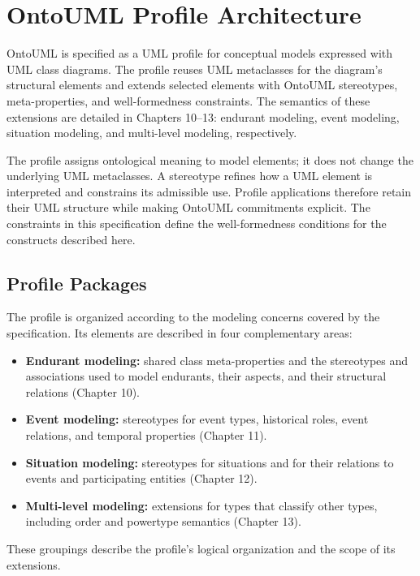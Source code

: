 \chapter{OntoUML Profile Architecture}
\label{ch:profile-architecture}

OntoUML is specified as a UML profile for conceptual models expressed with UML class diagrams. The profile reuses UML metaclasses for the diagram's structural elements and extends selected elements with OntoUML stereotypes, meta-properties, and well-formedness constraints. The semantics of these extensions are detailed in Chapters 10--13: endurant modeling, event modeling, situation modeling, and multi-level modeling, respectively.

The profile assigns ontological meaning to model elements; it does not change the underlying UML metaclasses. A stereotype refines how a UML element is interpreted and constrains its admissible use. Profile applications therefore retain their UML structure while making OntoUML commitments explicit. The constraints in this specification define the well-formedness conditions for the constructs described here.

\section{Profile Packages}
\label{sec:profile-packages}

The profile is organized according to the modeling concerns covered by the specification. Its elements are described in four complementary areas:

\begin{itemize}
    \item \textbf{Endurant modeling:} shared class meta-properties and the stereotypes and associations used to model endurants, their aspects, and their structural relations (Chapter 10).
    \item \textbf{Event modeling:} stereotypes for event types, historical roles, event relations, and temporal properties (Chapter 11).
    \item \textbf{Situation modeling:} stereotypes for situations and for their relations to events and participating entities (Chapter 12).
    \item \textbf{Multi-level modeling:} extensions for types that classify other types, including order and powertype semantics (Chapter 13).
\end{itemize}

These groupings describe the profile's logical organization and the scope of its extensions. %

